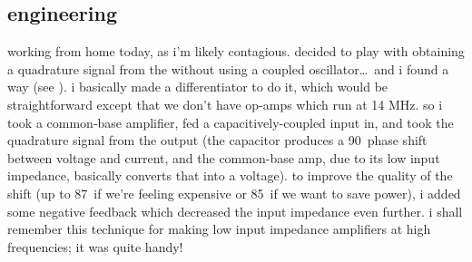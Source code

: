 \subsection*{engineering}
working from home today, as i'm likely contagious. decided to play with
obtaining a quadrature signal from the \pll without using a coupled
oscillator\ldots\ and i found a way (see
). i basically made a
differentiator to do it, which would be straightforward except that we don't
have op-amps which run at 14 MHz. so i took a common-base amplifier, fed a
capacitively-coupled input in, and took the quadrature signal from the output
(the capacitor produces a 90\textdegree\ phase shift between voltage and
current, and the common-base amp, due to its low input impedance, basically
converts that into a voltage). to improve the quality of the shift (up to
87\textdegree\ if we're feeling expensive or 85\textdegree\ if we want to save
power), i added some negative feedback which decreased the input impedance even
further. i shall remember this technique for making low input impedance
amplifiers at high frequencies; it was quite handy!

